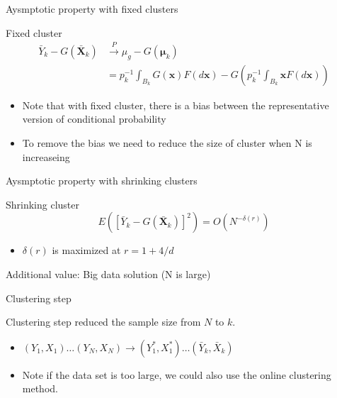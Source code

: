 \documentclass[ignorenonframetext,]{beamer}
\providecommand{\tightlist}{%
  \setlength{\itemsep}{0pt}\setlength{\parskip}{0pt}}
\begin{document}
\begin{frame}{Aysmptotic property with fixed clusters}

\begin{block}{Fixed cluster}
\begin{align*}
\bar{Y}_k - G(\bar{\mathbf X}_k) &\stackrel{P}{\longrightarrow} \mu_g - G(\boldsymbol{\mu}_k)\\
& = p_k^{-1} \int_{B_k} G({\mathbf x}) F(d{\mathbf x}) - G\left(p_k^{-1} \int_{B_k} {\mathbf x} F(d{\mathbf x})\right)
\end{align*}
\end{block}

\begin{itemize}
\tightlist
\item
  Note that with fixed cluster, there is a bias between the
  representative version of conditional probability
\item
  To remove the bias we need to reduce the size of cluster when N is
  increaseing
\end{itemize}

\end{frame}

\begin{frame}{Aysmptotic property with shrinking clusters}

\begin{block}{Shrinking cluster}
\[
E([\bar{Y}_k - G(\bar{\mathbf X}_k)]^2) = O(N^{-\delta(r)})
\]
\end{block}

\begin{itemize}
\tightlist
\item
  \(\delta(r)\) is maximized at \(r = 1 + 4/d\)
\end{itemize}

\end{frame}

\begin{frame}{Additional value: Big data solution (N is large)}

\begin{block}{Clustering step}

Clustering step reduced the sample size from \(N\) to \(k\).

\begin{itemize}
\item
  \((Y_1,X_1) \dots (Y_N,X_N) \to (Y^*_{1},X^*_{1}) \dots (\bar{Y}_k,\bar{X}_k)\)
\item
  Note if the data set is too large, we could also use the online
  clustering method.
\end{itemize}

\end{block}

\end{frame}
\end{document}
